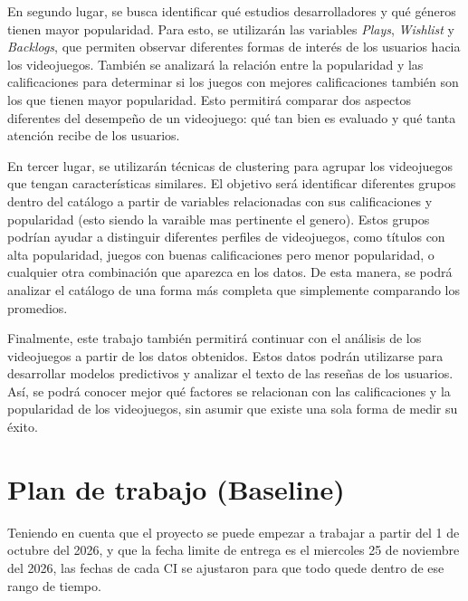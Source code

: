 \documentclass[letterpaper,11pt]{article}
\begin{document}
En segundo lugar, se busca identificar qué estudios desarrolladores y qué géneros tienen mayor popularidad. Para esto, se utilizarán las variables \textit{Plays}, \textit{Wishlist} y \textit{Backlogs}, que permiten observar diferentes formas de interés de los usuarios hacia los videojuegos. También se analizará la relación entre la popularidad y las calificaciones para determinar si los juegos con mejores calificaciones también son los que tienen mayor popularidad. Esto permitirá comparar dos aspectos diferentes del desempeño de un videojuego: qué tan bien es evaluado y qué tanta atención recibe de los usuarios. 

En tercer lugar, se utilizarán técnicas de clustering para agrupar los videojuegos que tengan características similares. El objetivo será identificar diferentes grupos dentro del catálogo a partir de variables relacionadas con sus calificaciones y popularidad (esto siendo la varaible mas pertinente el genero). Estos grupos podrían ayudar a distinguir diferentes perfiles de videojuegos, como títulos con alta popularidad, juegos con buenas calificaciones pero menor popularidad, o cualquier otra combinación que aparezca en los datos. De esta manera, se podrá analizar el catálogo de una forma más completa que simplemente comparando los promedios.

Finalmente, este trabajo también permitirá continuar con el análisis de los videojuegos a partir de los datos obtenidos. Estos datos podrán utilizarse para desarrollar modelos predictivos y analizar el texto de las reseñas de los usuarios. Así, se podrá conocer mejor qué factores se relacionan con las calificaciones y la popularidad de los videojuegos, sin asumir que existe una sola forma de medir su éxito.


\section{Plan de trabajo (Baseline)}

Teniendo en cuenta que el proyecto se puede empezar a trabajar a partir del 1 de octubre del 2026, y que la fecha limite de entrega es el miercoles 25 de noviembre del 2026, las fechas de cada CI se ajustaron para que todo quede dentro de ese rango de tiempo.
\end{document}
